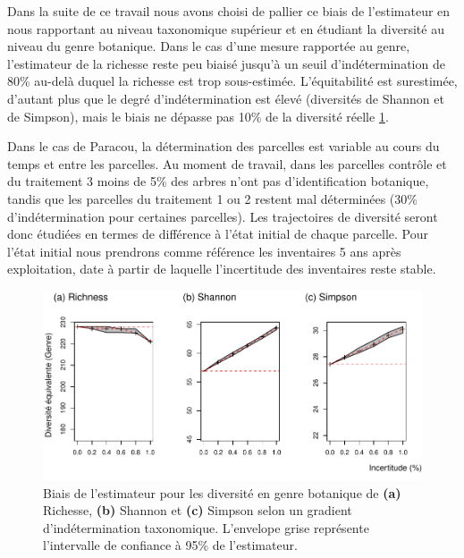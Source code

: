\documentclass[
  11pt,
  french,
  A4paper,
  extrafontsizes,onecolumn,openright
  ]{memoir}
\begin{document}
Dans la suite de ce travail nous avons choisi de pallier ce biais de
l'estimateur en nous rapportant au niveau taxonomique supérieur et en
étudiant la diversité au niveau du genre botanique. Dans le cas d'une
mesure rapportée au genre, l'estimateur de la richesse reste peu biaisé
jusqu'à un seuil d'indétermination de 80\% au-delà duquel la richesse
est trop sous-estimée. L'équitabilité est surestimée, d'autant plus que
le degré d'indétermination est élevé (diversités de Shannon et de
Simpson), mais le biais ne dépasse pas 10\% de la diversité réelle
\ref{fig:FigTreesGenus}.

Dans le cas de Paracou, la détermination des parcelles est variable au
cours du temps et entre les parcelles. Au moment de travail, dans les
parcelles contrôle et du traitement 3 moins de 5\% des arbres n'ont pas
d'identification botanique, tandis que les parcelles du traitement 1 ou
2 restent mal déterminées (30\% d'indétermination pour certaines
parcelles). Les trajectoires de diversité seront donc étudiées en termes
de différence à l'état initial de chaque parcelle. Pour l'état initial
nous prendrons comme référence les inventaires 5 ans après exploitation,
date à partir de laquelle l'incertitude des inventaires reste stable.

\begin{figure}

{\centering \includegraphics[width=1\linewidth]{Manuscript_files/figure-latex/FigTreesGenus-1} 

}

\caption{Biais de l'estimateur pour les diversité en genre botanique de \textbf{(a)} Richesse, \textbf{(b)} Shannon et \textbf{(c)} Simpson selon un gradient d'indétermination taxonomique. L'envelope grise représente l'intervalle de confiance à 95\% de l'estimateur.}\label{fig:FigTreesGenus}
\end{figure}
\end{document}
